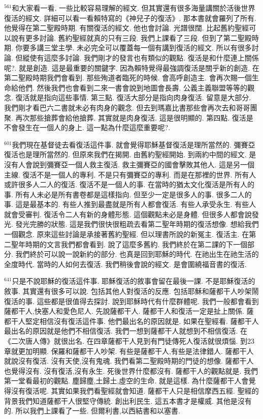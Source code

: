 \documentclass{book}
\begin{document}
$^{561}$和大家看一看.
一些比較容易理解的經文.
但其實還有很多海量講關於活後世界復活的經文.
詳細可以看一看賴特寫的《神兒子的復活》.
那本書就會羅列了所有.
他覺得在第二聖殿時期.
有關復活的經文.
他也會討論.
光譜很闊.
比起舊約聖經可以說有更多討論.
舊約聖經就真的只有三段.
我們上課看了三段.
但到了第二聖殿時期.
你要多講三堂主學.
未必完全可以覆蓋每一個有講到復活的經文.
所以有很多討論.
但縱使有這麼多討論.
我們剛才的發言也有類似的觀點.
復活是和什麼連上關係呢?.
就是創造.
這是最重要的關鍵字.
因為賴特覺得最強調復活是關乎新的創造.
在第二聖殿時期我們會看到.
那些殉道者臨死的時候.
會高呼創造主.
會再次賜一個生命給他們.
然後我們也會看到二來一書會說到地圖會長壽.
公義主義聯盟等等的觀念.
復活就是指向這些事情.
第三點.
復活大部分是指向肉身復活.
留意是大部分.
我們剛才看巴六二書就未必有肉身的觀念.
但去到瑪嘉比書那些會再次去和哥哥團聚.
再次那些搶葬會給他搶葬.
其實就是肉身復活.
這是很明顯的.
第四點.
復活是不會發生在一個人的身上.
這一點為什麼這麼重要呢?.

$^{601}$我們現在基督徒去看復活這件事.
就會覺得耶穌基督復活是理所當然的.
彌賽亞復活也是理所當然的.
但原來我們在揭開.
由舊約聖經開始.
到兩約中間的經文.
是沒有人會說到彌賽亞一個人救主復活.
救主彌賽亞的國會擊敗其他人.
這是另一個主線.
復活不是一個人的專利.
不是只有彌賽亞的專利.
而是在那裡的世界.
所有人或許很多人二人的復活.
復活不是一個人的事.
在當時的猶太文化復活是所有人的事.
所有人未必是所有書卷都是這樣指向.
但至少一定是很多人的事.
很多二人的事.
這是最基本的.
有些人推到最盡就是所有人都會復活.
有些人承受永生.
有些人就會受審判.
復活令二人有新的身體形態.
這個觀點未必是身體.
但很多人都會說發光.
發光完勝的狀態.
這是我們很快很粗疏去看第二聖年時期的復活想像.
想給我們一個觀念.
原來這些討論是承接著舊約聖經.
但以理書所說的新冤主.
復活主.
在第二聖年時期的文言我們都會看到.
說了這麼多舊約.
我們終於在第二課的下一個部分.
我們終於可以說一說新約的部分.
也真是回到耶穌的時代.
在祂出生在祂生活的全度時代.
當時的人如何去復活.
我們稍後會說的經文.
是會圍繞福音書的復活.

$^{641}$只是不說耶穌的復活這件事.
耶穌復活的敘事會留在最後一課.
不是耶穌復活的敘事.
其實還有很多可以說.
包括其他人對復活的反應.
包括耶穌和薩都干人吵架鬧復活的事.
這些都是很值得去探討.
說到耶穌時代有什麼群體呢.
我們一般都會看到薩都干人,快塞人和愛色尼人.
先說薩都干人.
薩都干人和復活一定是扯上關係.
薩都干人堅定相信沒有復活這件事.
他們最出名的原因就是.
如果在聖經看.
薩都干人最出名的原因就是他們不相信復活.
我們一想到薩都干人就想到不相信復活.
在《二次唐人傳》就很出名.
在四章薩都干人見到有門徒傳死人復活就很煩惱.
到23章就更加明顯.
保羅和薩都干人吵架.
有些是薩都干人,有些是法律錯人.
薩都干人就說沒有復活.
沒有天使,沒有鬼魂.
我們看第二聖殿時期的門徒的想像.
薩都干人也覺得沒有.
沒有復活,沒有永生.
死後世界什麼都沒有.
薩都干人的觀點就是.
我們第一堂看最初的觀點.
塵歸塵,土歸土,虛空的生命.
就是這樣.
為什麼薩都干人會覺得沒有復活呢.
其實如果我們看聖經就會知道.
薩都干人只是相信摩西五經.
聖經的背景我們知道薩都干人很堅守傳統.
創出利民生.
這五本書才是權威.
其他是沒有的.
所以我們上課看了一些.
但爾利書,以西結書和以塞書.
\end{document}
